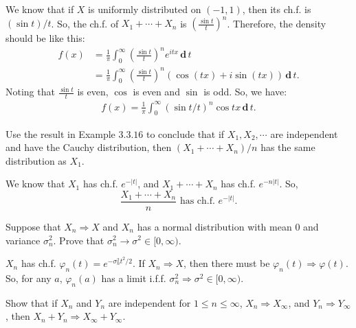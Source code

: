 \documentclass[en, normal, 12pt, black]{elegantnote}
\newenvironment{exercise}[1]{\begin{tcolorbox}[colback=black!15, colframe=black!80, breakable, title=#1]}{\end{tcolorbox}}
\newenvironment{solution}{\begin{tcolorbox}[colback=white, colframe=black!50, breakable, title=Solution. ]\setlength{\parskip}{0.8em}}{\end{tcolorbox}}
\newcommand{\der}{\,\mathbf{d}\,}
\begin{document}
\begin{solution}
    We know that if $X$ is uniformly distributed on $(-1,1)$, then its ch.f. is $(\sin t)/t$. So, the ch.f. of $X_1+\cdots+X_n$ is $\left(\frac{\sin t}{t}\right)^n$. Therefore, the density should be like this: 
    \[
        \begin{aligned}
            f(x)&=\frac{1}{\pi}\int_0^{\infty}\left(\frac{\sin t}{t}\right)^ne^{itx}\der t\\
            &=\frac{1}{\pi}\int_0^{\infty}\left(\frac{\sin t}{t}\right)^n\left(\cos(tx)+i\sin(tx)\right)\der t. 
        \end{aligned}
    \]
    Noting that $\frac{\sin t}{t}$ is even, $\cos$ is even and $\sin$ is odd. So, we have: 
    \[
        \begin{aligned}
            f(x)=\frac{1}{\pi} \int_{0}^{\infty}(\sin t / t)^{n} \cos t x \der t. 
        \end{aligned}
    \]
\end{solution}

\begin{exercise}{3.3.6}
    Use the result in Example $3.3.16$ to conclude that if $X_{1}, X_{2}, \cdots$ are independent and have the Cauchy distribution, then $\left(X_{1}+\cdots+X_{n}\right) / n$ has the same distribution as $X_{1}$. 
\end{exercise}

\begin{solution}
    We know that $X_1$ has ch.f. $e^{-|t|}$, and $X_1+\cdots+X_n$ has ch.f. $e^{-n|t|}$. So, 
    \[
        \frac{X_1+\cdots+X_n}{n}\text{ has ch.f. }e^{-|t|}. 
    \]
\end{solution}

\begin{exercise}{3.3.7}
    Suppose that $X_{n} \Rightarrow X$ and $X_{n}$ has a normal distribution with mean $0$ and variance $\sigma_{n}^{2}$. Prove that $\sigma_{n}^{2} \rightarrow \sigma^{2} \in[0, \infty)$. 
\end{exercise}

\begin{solution}
    $X_n$ has ch.f. $\varphi_n(t) = e^{−\sigma_n^2t^2/2}$. If $X_n\Rightarrow X$, then there must be $\varphi_n(t)\Rightarrow\varphi(t)$. So, for any $a$, $\varphi_n(a)$ has a limit i.f.f. $\sigma_n^2\Rightarrow\sigma^2\in[0,\infty)$. 
\end{solution}

\begin{exercise}{3.3.8}
    Show that if $X_{n}$ and $Y_{n}$ are independent for $1 \leqslant n \leqslant \infty$, $X_{n} \Rightarrow X_{\infty}$, and $Y_{n} \Rightarrow Y_{\infty}$, then $X_{n}+Y_{n} \Rightarrow X_{\infty}+Y_{\infty}$.
\end{exercise}
\end{document}
